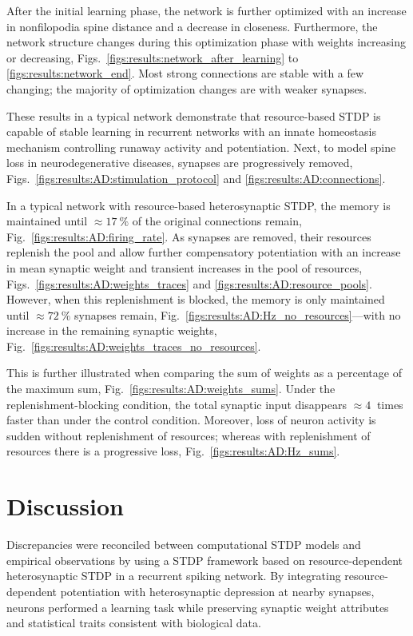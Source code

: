 \documentclass[utf8]{FrontiersinHarvard} %
\begin{document}
After the initial learning phase, the network is further optimized with an increase in nonfilopodia spine distance and a decrease in closeness. Furthermore, the network structure changes during this optimization phase with weights increasing or decreasing, Figs.~\ref{figs:results:network_after_learning} to \ref{figs:results:network_end}. Most strong connections are stable with a few changing; the majority of optimization changes are with weaker synapses.

These results in a typical network demonstrate that resource-based STDP is capable of stable learning in recurrent networks with an innate homeostasis mechanism controlling runaway activity and potentiation. Next, to model spine loss in neurodegenerative diseases, synapses are progressively removed, Figs.~\ref{figs:results:AD:stimulation_protocol} and \ref{figs:results:AD:connections}.

In a typical network with resource-based heterosynaptic STDP, the memory is maintained until $\approx\SI{17}{\percent}$ of the original connections remain, Fig.~\ref{figs:results:AD:firing_rate}. As synapses are removed, their resources replenish the pool and allow further compensatory potentiation with an increase in mean synaptic weight and transient increases in the pool of resources, Figs.~\ref{figs:results:AD:weights_traces} and \ref{figs:results:AD:resource_pools}. However, when this replenishment is blocked, the memory is only maintained until $\approx\SI{72}{\percent}$ synapses remain, Fig.~\ref{figs:results:AD:Hz_no_resources}---with no increase in the remaining synaptic weights, Fig.~\ref{figs:results:AD:weights_traces_no_resources}.

This is further illustrated when comparing the sum of weights as a percentage of the maximum sum, Fig.~\ref{figs:results:AD:weights_sums}. Under the replenishment-blocking condition, the total synaptic input disappears $\approx\SI{4}{}$ times faster than under the control condition. Moreover, loss of neuron activity is sudden without replenishment of resources; whereas with replenishment of resources there is a progressive loss, Fig.~\ref{figs:results:AD:Hz_sums}.

\section{Discussion}
Discrepancies were reconciled between computational STDP models and empirical observations by using a STDP framework based on resource-dependent heterosynaptic STDP in a recurrent spiking network. By integrating resource-dependent potentiation with heterosynaptic depression at nearby synapses, neurons performed a learning task while preserving synaptic weight attributes and statistical traits consistent with biological data.
\end{document}
